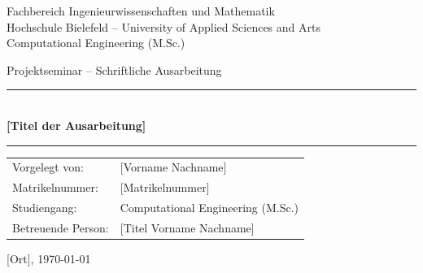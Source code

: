 \begin{titlepage}
\begin{center}

{\large
Fachbereich Ingenieurwissenschaften und Mathematik\\[2pt]
Hochschule Bielefeld -- University of Applied Sciences and Arts\\[2pt]
Computational Engineering (M.Sc.)
}

\vspace{2cm}
{\Large Projektseminar -- Schriftliche Ausarbeitung}\\[1cm]

\rule{\linewidth}{0.4pt}\\[0.4cm]
{\huge\bfseries [Titel der Ausarbeitung]}\\[0.4cm]
\rule{\linewidth}{0.4pt}

\vspace{3cm}

\begin{tabular}{ll}
Vorgelegt von:      & [Vorname Nachname] \\
Matrikelnummer:     & [Matrikelnummer] \\
Studiengang:        & Computational Engineering (M.Sc.) \\
Betreuende Person:  & [Titel Vorname Nachname] \\
\end{tabular}

\vfill
[Ort], \today

\end{center}
\end{titlepage}
